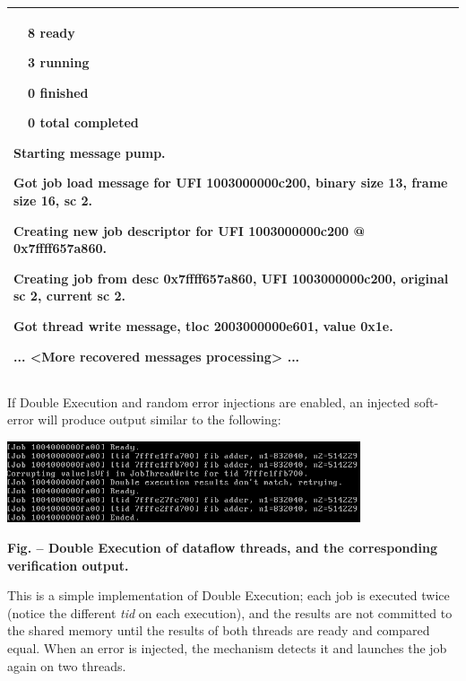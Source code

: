 \documentclass[a4paper]{article}
\newcounter{Figure}
\renewcommand\theFigure{\arabic{Figure}}
\begin{document}
\begin{flushleft}
\begin{supertabular}{|m{6.4018598in}|}
{\ttfamily \ \ 8 ready}

{\ttfamily \ \ 3 running}

{\ttfamily \ \ 0 finished}

{\ttfamily \ \ 0 total completed}

{ Starting
message pump.}

{ Got job
load message for UFI 1003000000c200, binary size 13, frame size 16, sc
2.}

{ Creating
new job descriptor for UFI 1003000000c200 @ 0x7ffff657a860.}

{\ttfamily [Job 1003000000c200] Creating job
from desc 0x7ffff657a860, UFI 1003000000c200, original sc 2, current sc
2.}

{ Got thread
write message, tloc 2003000000e601, value 0x1e.}

\ttfamily ... {\textless}More recovered messages
processing{\textgreater} ...\\\hline
\end{supertabular}
\end{flushleft}
{
If Double Execution and random error injections are enabled, an injected
soft-error will produce output similar to the following:}

{\centering 
\includegraphics[width=4.1055in,height=0.9429in]{img49.png}
\par}

{\centering{}\sffamily\bfseries
Fig.
\stepcounter{Figure}{\theFigure} -- Double Execution of dataflow
threads, and the corresponding verification output.
\par}

{
This is a simple implementation of Double Execution; each job is
executed twice (notice the different \textit{tid} on each execution),
and the results are not committed to the shared memory until the
results of both threads are ready and compared equal. When an error is
injected, the mechanism detects it and launches the job again on two
threads.}
\end{document}
